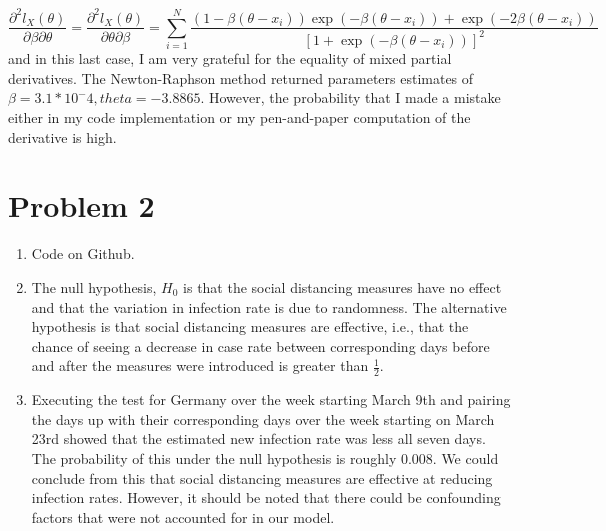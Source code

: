 \documentclass[a4paper,12pt]{article}
\begin{document}
\begin{enumerate}
\begin{equation}
\frac{\partial^{2}l_{X}(\theta)}{\partial \beta \partial \theta} = \frac{\partial^{2}l_{X}(\theta)}{\partial \theta \partial \beta} = \sum_{i = 1}^{N}{ \frac{  (1-\beta (\theta - x_{i})) \exp(-\beta (\theta -x_{i})) + \exp(-2\beta (\theta -x_{i}))   }    { \left[  1 + \exp(-\beta (\theta -x_{i}))   \right]^{2}  }    }
\end{equation}
and in this last case, I am very grateful for the equality of mixed partial derivatives. The Newton-Raphson method returned parameters estimates of $\beta = 3.1*10^-4, theta = -3.8865$. However, the probability that I made a mistake either in my code implementation or my pen-and-paper computation of the derivative is high. 

\end{enumerate}

\section{Problem 2}
\begin{enumerate}
\item Code on Github.
\item The null hypothesis, $H_{0}$ is that the social distancing measures have no effect and that the variation in infection rate is due to randomness. The alternative hypothesis is that social distancing measures are effective, i.e., that the chance of seeing a decrease in case rate between corresponding days before and after the measures were introduced is greater than $\frac{1}{2}$. 
\item Executing the test for Germany over the week starting March 9th and pairing the days up with their corresponding days over the week starting on March 23rd showed that the estimated new infection rate was less all seven days. The probability of this under the null hypothesis is roughly 0.008. We could conclude from this that social distancing measures are effective at reducing infection rates. However, it should be noted that there could be confounding factors that were not accounted for in our model. 
\end{enumerate}
\end{document}
